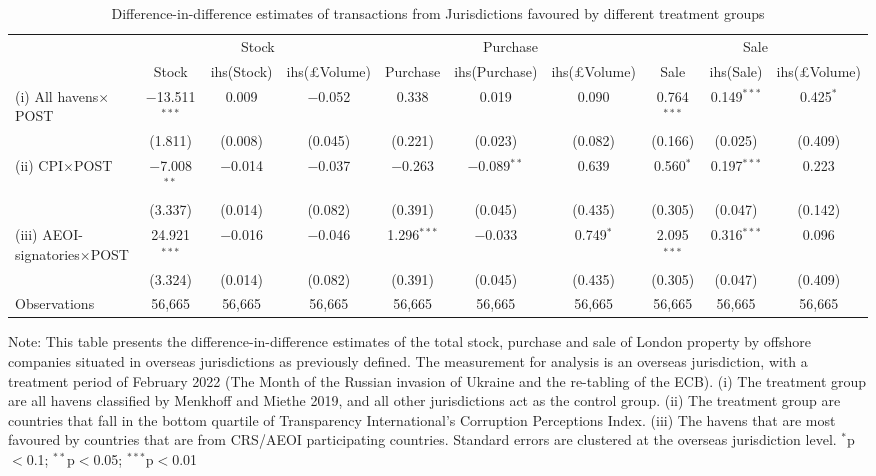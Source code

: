 \documentclass{article}
\begin{document}
\begin{table}[H]
\caption{Difference-in-difference estimates of  transactions from Jurisdictions favoured by different treatment groups}
\label{yourLabelHere}
\centering
\large %
  \begin{adjustbox}{width=1.25\textwidth,center}
\begin{threeparttable}
\begin{tabular}{@{}lccccccccc@{}}
\toprule
 & \multicolumn{3}{c}{Stock} & \multicolumn{3}{c}{Purchase} & \multicolumn{3}{c}{Sale} \\
\cmidrule{2-4} \cmidrule{5-7} \cmidrule{8-10}
& Stock & ihs(Stock) & ihs(£Volume) & Purchase & ihs(Purchase) & ihs(£Volume) & Sale & ihs(Sale) & ihs(£Volume) \\
\midrule
(i) All havens$\times$POST & $-$13.511$^{***}$ & 0.009 & $-$0.052 & 0.338 & 0.019 & 0.090 & 0.764$^{***}$ & 0.149$^{***}$ & 0.425$^{*}$ \\
& (1.811) & (0.008) &  (0.045) & (0.221) & (0.023) & (0.082) & (0.166) & (0.025) & (0.409) \\
\midrule
(ii) CPI$\times$POST & $-$7.008$^{**}$ & $-$0.014 & $-$0.037 & $-$0.263 & $-$0.089$^{**}$ & 0.639 & 0.560$^{*}$ & 0.197$^{***}$ & 0.223 \\
 & (3.337) & (0.014) & (0.082) & (0.391) & (0.045) & (0.435) & (0.305) & (0.047) & (0.142)\\
\midrule
(iii) AEOI-signatories$\times$POST & 24.921$^{***}$& $-$0.016 & $-$0.046 & 1.296$^{***}$ & $-$0.033 & 0.749$^{*}$ & 2.095$^{***}$ & 0.316$^{***}$ & 0.096 \\ 
& (3.324) & (0.014) & (0.082) & (0.391) & (0.045)  & (0.435) & (0.305) & (0.047) & (0.409) \\ 
\midrule
Observations & 56,665 & 56,665 & 56,665 & 56,665 & 56,665 & 56,665 & 56,665 & 56,665 & 56,665 \\
\bottomrule
\end{tabular}
\begin{tablenotes}
    \item Note: This table presents the difference-in-difference estimates of the total stock, purchase and sale of London property by offshore companies situated in overseas jurisdictions as previously defined. The measurement for analysis is an overseas jurisdiction, with a treatment period of February 2022 (The Month of the Russian invasion of Ukraine and the re-tabling of the ECB). (i) The treatment group are all havens classified by Menkhoff and Miethe 2019, and all other jurisdictions act as the control group. (ii) The treatment group are countries that fall in the bottom quartile of Transparency International's Corruption Perceptions Index. (iii) The havens that are most favoured by countries that are from CRS/AEOI participating countries. Standard errors are clustered at the overseas jurisdiction level.    $^{*}$p$<$0.1; $^{**}$p$<$0.05; $^{***}$p$<$0.01
\end{tablenotes}
\end{threeparttable}
\end{adjustbox}
\end{table}
\end{document}
